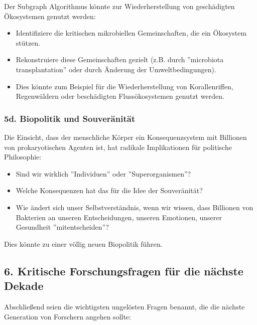 \documentclass[a4paper,12pt]{article}
\theoremstyle{definition}
\begin{document}
Der Subgraph Algorithmus könnte zur Wiederherstellung von geschädigten Ökosystemen genutzt werden:
\begin{itemize}
    \item Identifiziere die kritischen mikrobiellen Gemeinschaften, die ein Ökosystem stützen.
    
    \item Rekonstruiere diese Gemeinschaften gezielt (z.B. durch ''microbiota transplantation'' oder durch Änderung der Umweltbedingungen).
    
    \item Dies könnte zum Beispiel für die Wiederherstellung von Korallenriffen, Regenwäldern oder beschädigten Flussökosystemen genutzt werden.
\end{itemize}

\subsubsection{5d. Biopolitik und Souveränität}

Die Einsicht, dass der menschliche Körper ein Konsequenzsystem mit Billionen von prokaryotischen Agenten ist, hat radikale Implikationen für politische Philosophie:
\begin{itemize}
    \item Sind wir wirklich ''Individuen'' oder ''Superorganismen''?
    \item Welche Konsequenzen hat das für die Idee der Souveränität?
    \item Wie ändert sich unser Selbstverständnis, wenn wir wissen, dass Billionen von Bakterien an unseren Entscheidungen, unseren Emotionen, unserer Gesundheit ''mitentscheiden''?
\end{itemize}

Dies könnte zu einer völlig neuen Biopolitik führen.

\subsection{6. Kritische Forschungsfragen für die nächste Dekade}

Abschließend seien die wichtigsten ungelösten Fragen benannt, die die nächste Generation von Forschern angehen sollte:
\end{document}
